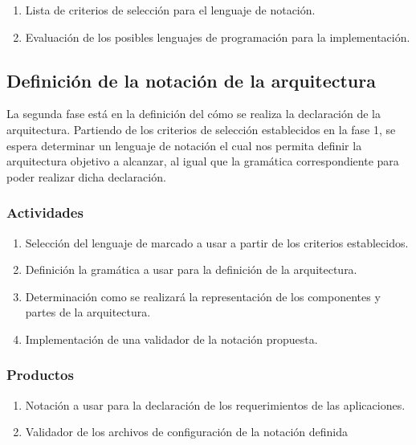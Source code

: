 \begin{enumerate}
    \itemsep-2mm
    \item Lista de criterios de selección para el lenguaje de notación.
    \item Evaluación de los posibles lenguajes de programación para la implementación.
\end{enumerate}

\subsection{Definición de la notación de la arquitectura}

La segunda fase está en la definición del cómo se realiza la declaración de la arquitectura. Partiendo de los criterios de selección establecidos en la fase 1, se espera determinar un lenguaje de notación el cual nos permita definir la arquitectura objetivo a alcanzar, al igual que la gramática correspondiente para poder realizar dicha declaración. 

\subsubsection*{Actividades}

\begin{enumerate}
    \itemsep-2mm
    \item Selección del lenguaje de marcado a usar a partir de los criterios establecidos.
    \item Definición la gramática a usar para la definición de la arquitectura.
    \item Determinación como se realizará la representación de los componentes y partes de la arquitectura.
    \item Implementación de una validador de la notación propuesta.
\end{enumerate}    

\subsubsection*{Productos}

\begin{enumerate}
    \itemsep-2mm
    \item Notación a usar para la declaración de los requerimientos de las aplicaciones.
    \item Validador de los archivos de configuración de la notación definida
\end{enumerate}

